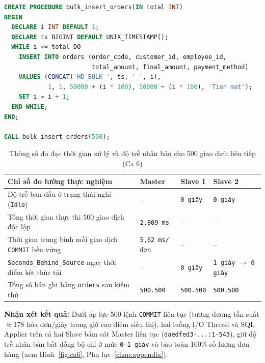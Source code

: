 \documentclass[12pt,a4paper]{report}
\begin{document}
\begin{lstlisting}[language=SQL, label={lst:ca6_lag}, caption={Stored Procedure bơm liên tiếp 500 giao dịch hóa đơn độc lập vào Master (Ca 6)}]
CREATE PROCEDURE bulk_insert_orders(IN total INT)
BEGIN
  DECLARE i INT DEFAULT 1;
  DECLARE ts BIGINT DEFAULT UNIX_TIMESTAMP();
  WHILE i <= total DO
    INSERT INTO orders (order_code, customer_id, employee_id,
                        total_amount, final_amount, payment_method)
    VALUES (CONCAT('HD_BULK_', ts, '_', i),
            1, 1, 50000 + (i * 100), 50000 + (i * 100), 'Tien mat');
    SET i = i + 1;
  END WHILE;
END;

CALL bulk_insert_orders(500);
\end{lstlisting}

\begin{table}[H]
\centering
\footnotesize
\caption{Thông số đo đạc thời gian xử lý và độ trễ nhân bản cho 500 giao dịch liên tiếp (Ca 6)}
\label{tab:ca6_results}
\vspace{0.15cm}
\begin{tabularx}{\textwidth}{Y L{3.0cm} L{3.0cm} L{3.0cm}}
\toprule
\textbf{Chỉ số đo lường thực nghiệm} & \textbf{Master} & \textbf{Slave 1} & \textbf{Slave 2} \\
\midrule
Độ trễ ban đầu ở trạng thái nghỉ (\texttt{Idle}) & -- & \texttt{0 giây} & \texttt{0 giây} \\
Tổng thời gian thực thi 500 giao dịch độc lập & \texttt{2.809 ms} & -- & -- \\
Thời gian trung bình mỗi giao dịch \texttt{COMMIT} bền vững & \texttt{5,62 ms/đơn} & -- & -- \\
\texttt{Seconds\_Behind\_Source} ngay thời điểm kết thúc tải & -- & \texttt{0 giây} & \texttt{1 giây} $\to$ \texttt{0 giây} \\
Tổng số bản ghi bảng \texttt{orders} sau kiểm thử & \texttt{500.500} & \texttt{500.500} & \texttt{500.500} \\
\bottomrule
\end{tabularx}
\end{table}

\noindent \textbf{Nhận xét kết quả:} Dưới áp lực 500 lệnh \texttt{COMMIT} liên tục (tương đương tần suất $\approx 178$ hóa đơn/giây trong giờ cao điểm siêu thị), hai luồng I/O Thread và SQL Applier trên cả hai Slave bám sát Master liên tục (\texttt{daedfed3-...:1-543}), giữ độ trễ nhân bản bất đồng bộ chỉ ở mức \texttt{0--1 giây} và bảo toàn 100\% số lượng đơn hàng (xem Hình~\ref{fig:ca6}, Phụ lục~\ref{chap:appendix}).
\end{document}
